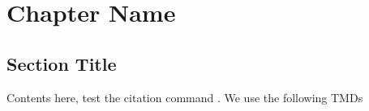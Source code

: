 \chapter{Chapter Name}\label{chap:one}
\section{Section Title}

Contents here, test the citation command \cite{Li2012}. We use the following TMDs 
